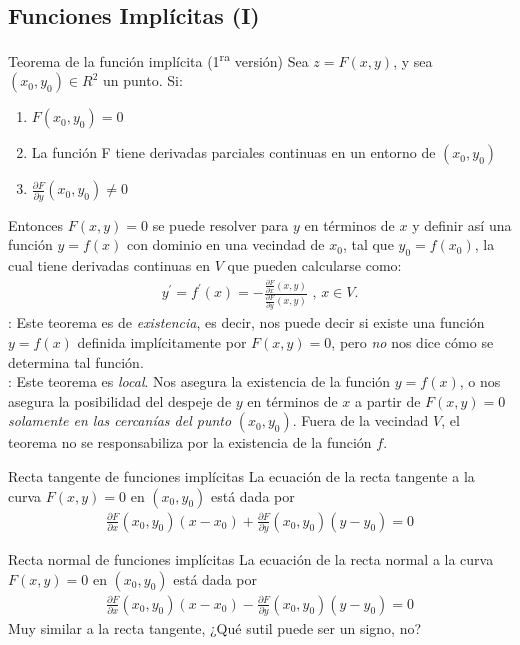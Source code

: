 \documentclass[a4paper, twoside]{article}
\numberwithin{equation}{section}
\numberwithin{figure}{section}
\numberwithin{table}{section}
\begin{document}
\subsection{Funciones Implícitas (I)}
\begin{teorema*}{Teorema de la función implícita (1\textsuperscript{ra} versión)}
	Sea $z=F(x,y)$, y sea $(x_0,y_0) \in R^2$ un punto. Si:
	\begin{enumerate}
		\item $F\left(x_{0},y_{0}\right)=0$
		\item La función F tiene derivadas parciales continuas en un entorno de $(x_0,y_0)$
		\item $\frac{\partial F}{\partial y}(x_0,y_0)\ne0$
	\end{enumerate}
	Entonces $F(x,y)=0$ se puede resolver para $y$ en términos de $x$ y definir así una función $y=f(x)$ con dominio en una vecindad de $x_0$, tal que $y_0=f(x_0)$, la cual tiene derivadas continuas en $V$ que pueden calcularse como:
	\begin{align}
		y^{'}=f^{'}\left(x\right)=-\frac{\frac{\partial F}{\partial x}(x,y)}{\frac{\partial F}{\partial y}(x,y)} \text{ , } x\in V.
	\end{align}
	: Este teorema es de \textit{existencia}, es decir, nos puede decir si existe una función $y=f(x)$ definida implícitamente por $F(x,y)=0$, pero \textit{no} nos dice cómo se determina tal función.\\
	
	: Este teorema es \textit{local}. Nos asegura la existencia de la función $y=f(x)$, o nos asegura la posibilidad del despeje de $y$ en términos de $x$ a partir de $F(x,y)=0$ \textit{solamente en las cercanías del punto }$(x_0,y_0)$. Fuera de la vecindad $V$, el teorema no se responsabiliza por la existencia de la función $f$.
\end{teorema*}

\begin{corolario*}{Recta tangente de funciones implícitas}
	La ecuación de la recta tangente a la curva $F(x,y)=0$ en $(x_{0},y_{0})$ está dada por
	\begin{align}
		\frac{\partial F}{\partial x}(x_0,y_0)(x-x_0)+\frac{\partial F}{\partial y}(x_0,y_0)(y-y_0)=0
	\end{align}
\end{corolario*}

\begin{corolario*}{Recta normal de funciones implícitas}
	La ecuación de la recta normal a la curva $F(x,y)=0$ en $(x_{0},y_{0})$ está dada por
	\begin{align}
		\frac{\partial F}{\partial x}(x_0,y_0)(x-x_0)-\frac{\partial F}{\partial y}(x_0,y_0)(y-y_0)=0
	\end{align}
	Muy similar a la recta tangente, ¿Qué sutil puede ser un signo, no?
\end{corolario*}
\end{document}
